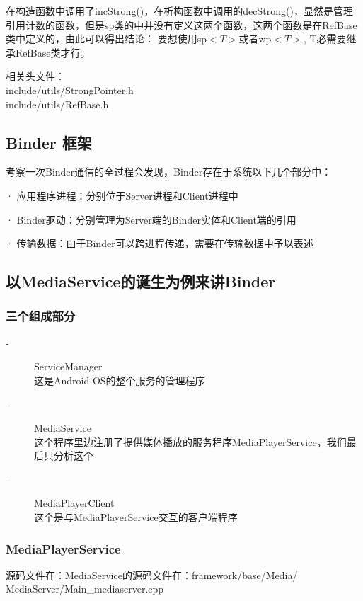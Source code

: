 \documentclass[a4paper,11pt]{article}
\begin{document}
\begin{CJK*}{UTF8}{gbsn}
    在构造函数中调用了incStrong()，在析构函数中调用的decStrong()，显然是管理引用计数的函数，但是sp类的中并没有定义这两个函数，这两个函数是在RefBase类中定义的，由此可以得出结论：
    {\color{red}要想使用sp$<T>$或者wp$<T>$, T必需要继承RefBase类才行}。

    相关头文件：\\
    include/utils/StrongPointer.h \\
    include/utils/RefBase.h

    \subsection{Binder 框架}
    考察一次Binder通信的全过程会发现，Binder存在于系统以下几个部分中：

    · 应用程序进程：分别位于Server进程和Client进程中

    · Binder驱动：分别管理为Server端的Binder实体和Client端的引用

    · 传输数据：由于Binder可以跨进程传递，需要在传输数据中予以表述

    \subsection{以MediaService的诞生为例来讲Binder}
    \subsubsection{三个组成部分}
    \begin{description}
        \item[-] ServiceManager \\ 这是Android OS的整个服务的管理程序
        \item[-] MediaService \\ 这个程序里边注册了提供媒体播放的服务程序MediaPlayerService，我们最后只分析这个
        \item[-] MediaPlayerClient \\ 这个是与MediaPlayerService交互的客户端程序
    \end{description}
    \subsubsection{MediaPlayerService}
    源码文件在：MediaService的源码文件在：framework/base/Media/\\MediaServer/Main\_mediaserver.cpp 


\end{CJK*}
\end{document}
